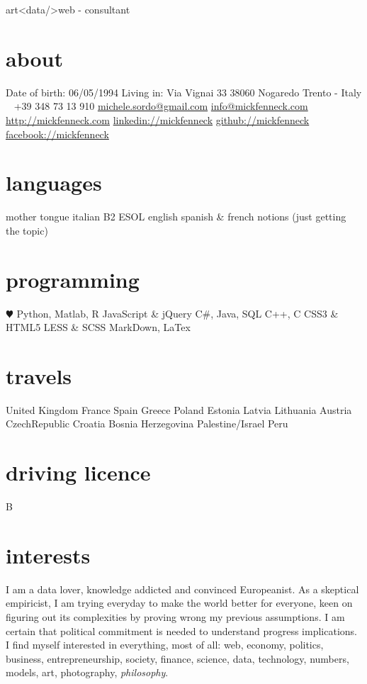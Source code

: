 \documentclass[]{friggeri-cv}
\begin{document}
       {art<data/>web - consultant}


\begin{aside}
  \section{about}
    Date of birth:
    06/05/1994
    Living in:
    Via Vignai 33
    38060 Nogaredo
    Trento - Italy
    ~
    +39 348 73 13 910
    \href{mailto:michele.sordo@gmail.com}{michele.sordo@gmail.com}
    \href{mailto:info@mickfenneck.com}{info@mickfenneck.com}
    \href{http://mickfenneck.com}{http://mickfenneck.com}
    \href{http://linkedin.com/in/mickfenneck}{linkedin://mickfenneck}
    \href{http://github.com/mickfenneck}{github://mickfenneck}
    \href{http://facebook.com/mickfenneck}{facebook://mickfenneck}
  \section{languages}
    mother tongue italian
    B2 ESOL english
    spanish \& french notions
    (just getting the topic)
  \section{programming}
    {\color{red} $\varheartsuit$} Python,
    Matlab, R
    JavaScript \& jQuery
    C\#, Java, SQL
    C++, C
    CSS3 \& HTML5
    LESS \& SCSS
    MarkDown, LaTex
\section{travels}
    United Kingdom
    France
    Spain
    Greece
    Poland
    Estonia
    Latvia
    Lithuania
    Austria
    CzechRepublic
    Croatia
    Bosnia Herzegovina
    Palestine/Israel
    Peru
\section{driving licence}
    B
\end{aside}






\section{interests}
I am a data lover, knowledge addicted and convinced Europeanist. As a skeptical empiricist, I am trying everyday to make the world better for everyone, keen on figuring out its complexities by proving wrong my previous assumptions. I am certain that political commitment is needed to understand progress implications. I find myself interested in everything, most of all: web, economy, politics, business, entrepreneurship, society, finance, science, data, technology, numbers, models, art, photography, \emph{philosophy}.
\end{document}
